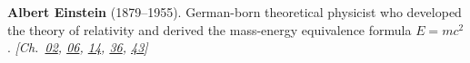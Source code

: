 \nobelphysics \textbf{Albert Einstein} (1879–1955). German-born theoretical physicist who developed the theory of relativity and derived the mass-energy equivalence formula $E = mc^2$. \emph{[Ch.~\hyperref[ch:acceleratinguniverse]{02}, \hyperref[ch:gravitytimedilation]{06}, \hyperref[ch:compacttwinparadox]{14}, \hyperref[ch:qftvsgr]{36}, \hyperref[ch:nearflatuniverse]{43}]}

